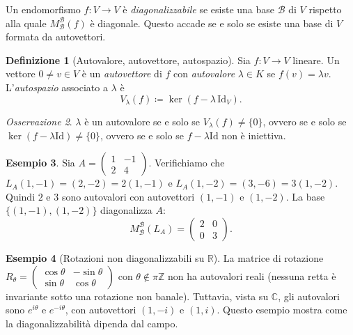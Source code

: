 \documentclass[11pt, a4paper]{book}
\theoremstyle{definition}
\newtheorem{definizione}{Definizione}[section]
\newtheorem{esempio}[definizione]{Esempio}
\theoremstyle{plain}
\theoremstyle{remark}
\newtheorem{osservazione}[definizione]{Osservazione}
\newcommand{\Z}{\mathbb{Z}}
\newcommand{\R}{\mathbb{R}}
\newcommand{\C}{\mathbb{C}}
\newcommand{\Id}{\mathrm{Id}}
\begin{document}
Un endomorfismo $f \colon V \to V$ è \emph{diagonalizzabile} se esiste una base $\mathcal{B}$ di $V$ rispetto alla quale $M^\mathcal{B}_\mathcal{B}(f)$ è diagonale. Questo accade se e solo se esiste una base di $V$ formata da autovettori.

\begin{defbox}
\begin{definizione}[Autovalore, autovettore, autospazio]
Sia $f \colon V \to V$ lineare. Un vettore $0 \neq v \in V$ è un \emph{autovettore} di $f$ con \emph{autovalore} $\lambda \in K$ se $f(v) = \lambda v$. L'\emph{autospazio} associato a $\lambda$ è
\[
  V_\lambda(f) \coloneqq \ker(f - \lambda\, \Id_V).
\]
\end{definizione}
\end{defbox}

\begin{osservazione}
$\lambda$ è un autovalore se e solo se $V_\lambda(f) \neq \{0\}$, ovvero se e solo se $\ker(f - \lambda \Id) \neq \{0\}$, ovvero se e solo se $f - \lambda \Id$ non è iniettiva.
\end{osservazione}

\begin{exbox}
\begin{esempio}
Sia $A = \begin{pmatrix} 1 & -1 \\ 2 & 4 \end{pmatrix}$. Verifichiamo che $L_A(1,-1) = (2,-2) = 2(1,-1)$ e $L_A(1,-2) = (3,-6) = 3(1,-2)$. Quindi $2$ e $3$ sono autovalori con autovettori $(1,-1)$ e $(1,-2)$. La base $\{(1,-1),(1,-2)\}$ diagonalizza $A$:
\[
  M^\mathcal{B}_\mathcal{B}(L_A) = \begin{pmatrix} 2 & 0 \\ 0 & 3 \end{pmatrix}.
\]
\end{esempio}
\end{exbox}

\begin{exbox}
\begin{esempio}[Rotazioni non diagonalizzabili su $\R$]
La matrice di rotazione $R_\theta = \begin{pmatrix} \cos\theta & -\sin\theta \\ \sin\theta & \cos\theta \end{pmatrix}$ con $\theta \notin \pi\Z$ non ha autovalori reali (nessuna retta è invariante sotto una rotazione non banale). Tuttavia, vista su $\C$, gli autovalori sono $e^{i\theta}$ e $e^{-i\theta}$, con autovettori $(1, -i)$ e $(1, i)$. Questo esempio mostra come la diagonalizzabilità dipenda dal campo.
\end{esempio}
\end{exbox}
\end{document}
